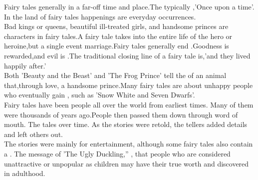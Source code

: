 

\immediate{}
\immediate{}
%
\begin{minipage}[b][14cm][t]{\textwidth}
\begin{center}\large{}\end{center}
\begin{large}
Fairy tales generally  in a far-off time and place.The typically ,'Once upon a time'. In the land of fairy tales  happenings are everyday occurrences. \\[3pt]
Bad kings or queens, beautiful  ill-treated girls, and handsome princes are  characters in fairy tales.A fairy tale takes into  the entire life of the hero or heroine,but  a single event  marriage.Fairy tales generally end .Goodness is rewarded,and evil is .The traditional closing line of a fairy tale is,'and they lived happily  after.'\\[3pt]
Both 'Beauty and the Beast' and 'The Frog Prince' tell the  of an animal that,through love, a handsome prince.Many fairy tales are about unhappy people who eventually gain , such as 'Snow White and Seven Dwarfs'.\\[3pt]
Fairy tales have been  people all over the world from earliest times. Many of them were  thousands of years ago.People then passed them down through word of mouth. The tales
 over time. As the stories were retold, the tellers added
 details and left others out.\\[3pt]
The stories were  mainly for entertainment, although some fairy tales also contain a . The message of 'The Ugly Duckling,'' ,  that people who are considered unattractive or unpopular as children may have their true worth and  discovered in adulthood.
\end{large}
\end{minipage}

